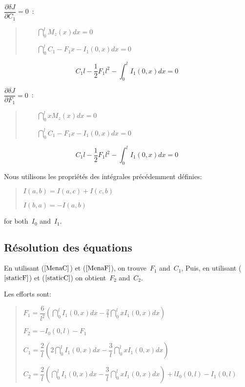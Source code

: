 $\dfrac{\partial \delta J}{\partial C_1}=0$~:

\begin{quotation}
$\qquad \dint_0^lM_z(x)dx=0$

$\qquad \dint_0^lC_1-F_1x-I_1(0,x)dx=0$
\end{quotation}

\begin{equation}
  \label{MenaC}
  C_1l-\frac 12F_1l^2-\int_0^lI_1(0,x)dx=0
\end{equation}

$\dfrac{\partial \delta J}{\partial F_1}=0$~:

\begin{quotation}
$\qquad \dint_0^lxM_z(x)dx=0$

$\qquad \dint_0^lC_1-F_1x-I_1(0,x)dx=0$
\end{quotation}

\begin{equation}
  \label{MenaF}
  C_1l-\frac 12F_1l^2-\int_0^lI_1(0,x)dx=0
\end{equation}

Nous utilisons les propriétés des intégrales précédemment définies:

\begin{quotation}
$I(a,b)=I(a,c)+I(c,b)$

$I(b,a)=-I(a,b)$
\end{quotation}

for both~$I_0$ and~$I_1$.


\medskip
\subsection{Résolution des équations}

En utilisant ($\ref{MenaC}$) et ($\ref{MenaF}$), on trouve~$F_1$ and~$C_1$,
Puis, en utilisant ($\ref{staticF}$) et ($\ref{staticC}$) on obtient~$F_2$ and~$C_2$.

Les efforts sont:

\begin{quotation}
$F_1=\dfrac 6{l^2}\left( \dint_0^lI_1(0,x)dx-\frac
2l\dint_0^lxI_1(0,x)dx\right)~$

$F_2=-I_0(0,l)-F_1$

$C_1=\dfrac 2l\left( 2\dint_0^lI_1(0,x)dx-\dfrac
3l\dint_0^lxI_1(0,x)dx\right)~$

$C_2=\dfrac 2l\left( \dint_0^lI_1(0,x)dx-\dfrac
3l\dint_0^lxI_1(0,x)dx\right) +lI_0(0,l)-I_1(0,l)$
\end{quotation}


